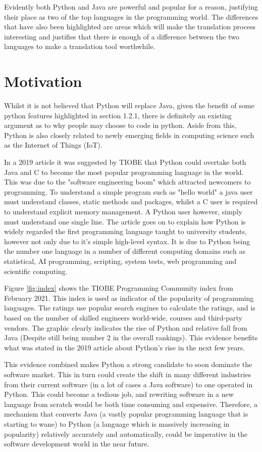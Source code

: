 \documentclass{l4proj}
\begin{document}
Evidently both Python and Java are powerful and popular for a reason, justifying their place as two of the top languages in the programming world. The differences that have also been highlighted are areas which will make the translation process interesting and justifies that there is enough of a difference between the two languages to make a translation tool worthwhile.

\section{Motivation}
Whilst it is not believed that Python will replace Java, given the benefit of some python features highlighted in section 1.2.1, there is definitely an existing argument as to why people may choose to code in python. Aside from this, Python is also closely related to newly emerging fields in computing science such as the Internet of Things (IoT).

In a 2019 article it was suggested by TIOBE that Python could overtake both Java and C to become the most popular programming language in the world. This was due to the "software engineering boom" which attracted newcomers to programming. To understand a simple program such as "hello world" a java user must understand classes, static methods and packages, whilst a C user is required to understand explicit memory management. A Python user however, simply must understand one single line.
The article goes on to explain how Python is widely regarded the first programming language taught to university students, however not only due to it's simple high-level syntax. It is due to Python being the number one language in a number of different computing domains such as statistical, AI programming, scripting, system tests, web programming and scientific computing.

Figure \ref{fig:index} shows the TIOBE Programming Community index from February 2021. This index is used as indicator of the popularity of programming languages. The ratings use popular search engines to calculate the ratings, and is based on the number of skilled engineers world-wide, courses and third-party vendors. The graphic clearly indicates the rise of Python and relative fall from Java (Despite still being number 2 in the overall rankings). This evidence benefits what was stated in the 2019 article about Python's rise in the next few years.

This evidence combined makes Python a strong candidate to soon dominate the software market. This in turn could create the shift in many different industries from their current software (in a lot of cases a Java software) to one operated in Python. This could become a tedious job, and rewriting software in a new language from scratch would be both time consuming and expensive. Therefore, a mechanism that converts Java (a vastly popular programming language that is starting to wane) to Python (a language which is massively increasing in popularity) relatively accurately and automatically, could be imperative in the software development world in the near future. 
\end{document}
